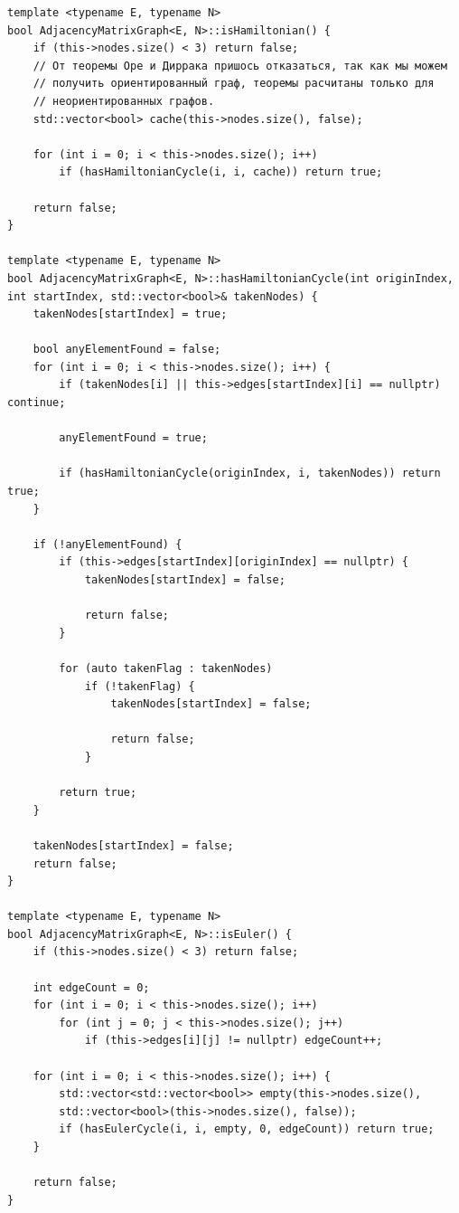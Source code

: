 \documentclass[a4paper,14pt]{extarticle}
\begin{document}
\begin{enumerate}[1.]
\begin{verbatim}
template <typename E, typename N>
bool AdjacencyMatrixGraph<E, N>::isHamiltonian() {
    if (this->nodes.size() < 3) return false;
    // От теоремы Оре и Диррака пришось отказаться, так как мы можем 
    // получить ориентированный граф, теоремы расчитаны только для 
    // неориентированных графов.
    std::vector<bool> cache(this->nodes.size(), false);

    for (int i = 0; i < this->nodes.size(); i++)
        if (hasHamiltonianCycle(i, i, cache)) return true;

    return false;
}

template <typename E, typename N>
bool AdjacencyMatrixGraph<E, N>::hasHamiltonianCycle(int originIndex, int startIndex, std::vector<bool>& takenNodes) {
    takenNodes[startIndex] = true;

    bool anyElementFound = false;
    for (int i = 0; i < this->nodes.size(); i++) {
        if (takenNodes[i] || this->edges[startIndex][i] == nullptr) continue;

        anyElementFound = true;
        
        if (hasHamiltonianCycle(originIndex, i, takenNodes)) return true;
    }

    if (!anyElementFound) {
        if (this->edges[startIndex][originIndex] == nullptr) {
            takenNodes[startIndex] = false;

            return false;
        }

        for (auto takenFlag : takenNodes) 
            if (!takenFlag) {
                takenNodes[startIndex] = false;

                return false;
            }

        return true;
    }

    takenNodes[startIndex] = false;
    return false;
}

template <typename E, typename N>
bool AdjacencyMatrixGraph<E, N>::isEuler() {
    if (this->nodes.size() < 3) return false;

    int edgeCount = 0;
    for (int i = 0; i < this->nodes.size(); i++) 
        for (int j = 0; j < this->nodes.size(); j++) 
            if (this->edges[i][j] != nullptr) edgeCount++;

    for (int i = 0; i < this->nodes.size(); i++) {
        std::vector<std::vector<bool>> empty(this->nodes.size(), 
        std::vector<bool>(this->nodes.size(), false));
        if (hasEulerCycle(i, i, empty, 0, edgeCount)) return true;
    }

    return false;
}


\end{verbatim}
\end{enumerate}
\end{document}

